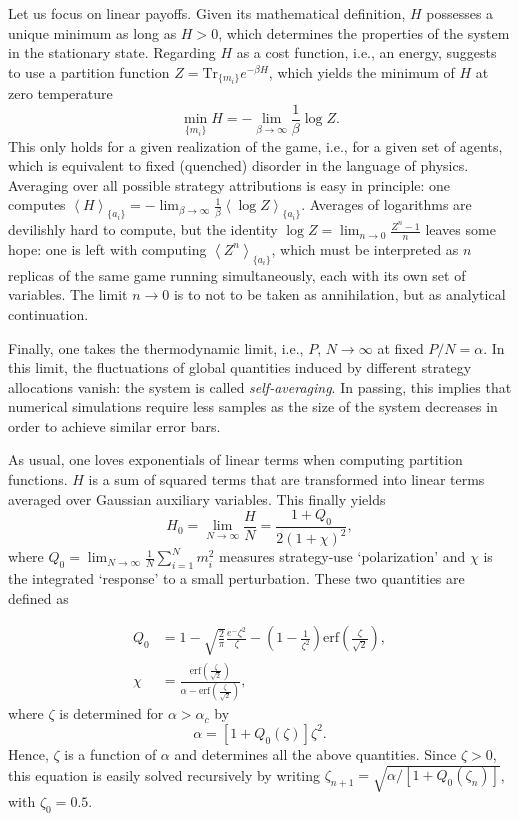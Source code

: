 \documentclass[aps,twocolumn,nofootinbib,sortedaddress,reprint]{revtex4-1}
\begin{document}
Let us focus on linear payoffs. Given its mathematical definition, $H$
possesses a unique minimum as long as $H>0$, which determines the
properties of the system in the stationary state. Regarding $H$ as a
cost function, i.e., an energy, suggests to use a partition function
$Z=\textrm{Tr}_{\{m_i\}}e^{-\beta H}$, which yields the minimum of $H$
at zero temperature
\begin{equation}
\min_{\{m_i\}} H=-\lim_{\beta\to \infty}\frac{1}{\beta}\log Z.
\end{equation}
This only holds for a given realization of the game, i.e., for a given
set of agents, which is equivalent to fixed (quenched) disorder in the language of
physics. Averaging over all possible strategy attributions is easy in
principle: one computes
$\left<H\right>_{\{a_i\}}=-\lim_{\beta\to\infty}\frac{1}{\beta}\left<\log
Z\right>_{\{a_i\}}$. Averages of logarithms are devilishly hard to compute,
but the identity $\log Z = \lim_{n\to0}\frac{Z^n-1}{n}$ leaves some
hope: one is left with computing $\left<Z^n\right>_{\{a_i\}}$, which must be
interpreted as $n$ replicas of the same game running simultaneously, each
with its own set of variables. The limit
$n\to0$ is to not to be taken as annihilation, but as analytical
continuation.

Finally, one takes the thermodynamic limit, i.e., $P$, $N\to\infty$ at
fixed $P/N=\alpha$. In this limit, the fluctuations of global
quantities induced by different strategy allocations vanish: the system
is called {\em self-averaging}. In passing, this implies that numerical
  simulations require less samples as the size of the system decreases
  in order to achieve similar error bars.

As usual, one loves exponentials of linear terms when computing
partition functions.  $H$ is a sum of squared terms that are transformed
into linear terms averaged over  Gaussian auxiliary
variables. This finally yields
\begin{equation}
H_0=\lim_{N\to\infty}\frac{H}{N}=\frac{1+Q_0}{2(1+\chi)^2},
\end{equation}
where $Q_0=\lim_{N\to\infty}\frac{1}{N}\sum_{i=1}^Nm_i^2$ measures
strategy-use `polarization' and $\chi$ is the integrated `response' to a
small perturbation. These two quantities are defined as

\begin{align}
Q_0&=1-\sqrt{\frac{2}{\pi}}\frac{e^-\zeta^2}{\zeta}-\left(1-\frac{1}{\zeta^2}\right)\textrm{erf}\left(\frac{\zeta}{\sqrt{2}}\right),\\ \chi&=\frac{\textrm{erf}\left(\frac{\zeta}{\sqrt{2}}\right)}{\alpha-\textrm{erf}\left(\frac{\zeta}{\sqrt{2}}\right)},
\end{align}
where $\zeta$ is determined for $\alpha>\alpha_c$ by
\begin{equation}
\alpha=[1+Q_0(\zeta)]\zeta^2.
\end{equation}
Hence, $\zeta$ is a function of $\alpha$ and determines all the above quantities. Since $\zeta>0$, this equation is easily solved recursively by writing
$\zeta_{n+1}=\sqrt{\alpha/[1+Q_0(\zeta_n)]}$, with $\zeta_0=0.5$.
\end{document}
